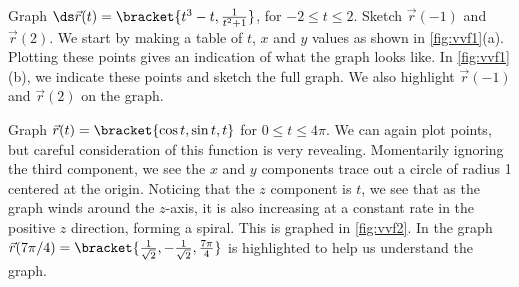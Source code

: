 \begin{example}\label{ex_vvf1}
Graph $\ds \vec r(t) =\bracket{t^3-t, \frac{1}{t^2+1}}$, for $-2\leq t\leq 2$. Sketch $\vec r(-1)$ and $\vec r(2)$.
\solution
We start by making a table of $t$, $x$ and $y$ values as shown in \autoref{fig:vvf1}(a). Plotting these points gives an indication of what the graph looks like. In \autoref{fig:vvf1}(b), we indicate these points and sketch the full graph. We also highlight $\vec r(-1)$ and $\vec r(2)$ on the graph.
\end{example}

\begin{example}\label{ex_vvf2}
Graph $\vec r(t) =\bracket{\cos t,\sin t,t}$ for $0\leq t\leq 4\pi$.
\solution
We can again plot points, but careful consideration of this function is very revealing. Momentarily ignoring the third component, we see the $x$ and $y$ components trace out a circle of radius 1 centered at the origin. Noticing that the $z$ component is $t$, we see that as the graph winds around the $z$-axis, it is also increasing at a constant rate in the positive $z$ direction, forming a spiral. This is graphed in \autoref{fig:vvf2}. In the graph $\vec r(7\pi/4)=\bracket{\frac1{\sqrt2},-\frac1{\sqrt2},\frac{7\pi}4}%
$ is highlighted to help us understand the graph.
\end{example}


%
%

